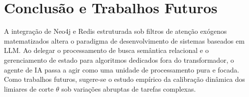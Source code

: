 \documentclass[11pt,a4paper]{article}
\begin{document}
\section{Conclusão e Trabalhos Futuros}
A integração de Neo4j e Redis estruturada sob filtros de atenção exógenos matematizados altera o paradigma de desenvolvimento de sistemas baseados em LLM. Ao delegar o processamento de busca semântica relacional e o gerenciamento de estado para algoritmos dedicados fora do transformador, o agente de IA passa a agir como uma unidade de processamento pura e focada. Como trabalhos futuros, sugere-se o estudo empírico da calibração dinâmica dos limiares de corte $\theta$ sob variações abruptas de tarefas complexas.
\end{document}
